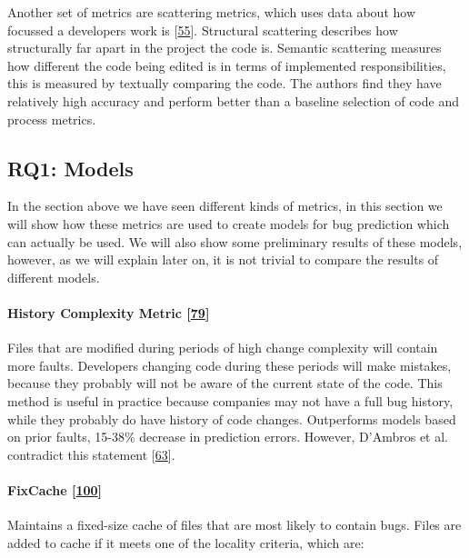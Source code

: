 \documentclass[]{book}
\let\oldparagraph\paragraph
\renewcommand{\paragraph}[1]{\oldparagraph{#1}\mbox{}}
\begin{document}
Another set of metrics are scattering metrics, which uses data about how
focussed a developers work is
{[}\protect\hyperlink{ref-DiNucci2018}{55}{]}. Structural scattering
describes how structurally far apart in the project the code is.
Semantic scattering measures how different the code being edited is in
terms of implemented responsibilities, this is measured by textually
comparing the code. The authors find they have relatively high accuracy
and perform better than a baseline selection of code and process
metrics.

\subsection{RQ1: Models}\label{rq1-models}

In the section above we have seen different kinds of metrics, in this
section we will show how these metrics are used to create models for bug
prediction which can actually be used. We will also show some
preliminary results of these models, however, as we will explain later
on, it is not trivial to compare the results of different models.

\paragraph{\texorpdfstring{History Complexity Metric
{[}\protect\hyperlink{ref-hassan2009}{79}{]}}{History Complexity Metric {[}79{]}}}\label{history-complexity-metric-hassan2009}

Files that are modified during periods of high change complexity will
contain more faults. Developers changing code during these periods will
make mistakes, because they probably will not be aware of the current
state of the code. This method is useful in practice because companies
may not have a full bug history, while they probably do have history of
code changes. Outperforms models based on prior faults, 15-38\% decrease
in prediction errors. However, D'Ambros et al. contradict this statement
{[}\protect\hyperlink{ref-DAmbros2010}{63}{]}.

\paragraph{\texorpdfstring{FixCache
{[}\protect\hyperlink{ref-kim2007}{100}{]}}{FixCache {[}100{]}}}\label{fixcache-kim2007}

Maintains a fixed-size cache of files that are most likely to contain
bugs. Files are added to cache if it meets one of the locality criteria,
which are:
\end{document}
